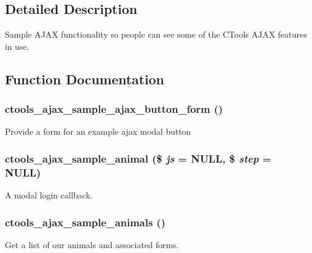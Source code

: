 \subsection{Detailed Description}
Sample AJAX functionality so people can see some of the CTools AJAX features in use. 

\subsection{Function Documentation}
\hypertarget{ctools__ajax__sample_8module_ae0f1db00a06daf20916bafe72305d5f9}{
\subsubsection[{ctools\_\-ajax\_\-sample\_\-ajax\_\-button\_\-form}]{\setlength{\rightskip}{0pt plus 5cm}ctools\_\-ajax\_\-sample\_\-ajax\_\-button\_\-form ()}}
\label{ctools__ajax__sample_8module_ae0f1db00a06daf20916bafe72305d5f9}
Provide a form for an example ajax modal button \hypertarget{ctools__ajax__sample_8module_ab5d64413c7e1e190f4db585faaba479f}{
\subsubsection[{ctools\_\-ajax\_\-sample\_\-animal}]{\setlength{\rightskip}{0pt plus 5cm}ctools\_\-ajax\_\-sample\_\-animal (\$ {\em js} = {\ttfamily NULL}, \/  \$ {\em step} = {\ttfamily NULL})}}
\label{ctools__ajax__sample_8module_ab5d64413c7e1e190f4db585faaba479f}
A modal login callback. \hypertarget{ctools__ajax__sample_8module_a8069492e8d6620eaebe3331105b18c21}{
\subsubsection[{ctools\_\-ajax\_\-sample\_\-animals}]{\setlength{\rightskip}{0pt plus 5cm}ctools\_\-ajax\_\-sample\_\-animals ()}}
\label{ctools__ajax__sample_8module_a8069492e8d6620eaebe3331105b18c21}
Get a list of our animals and associated forms.

